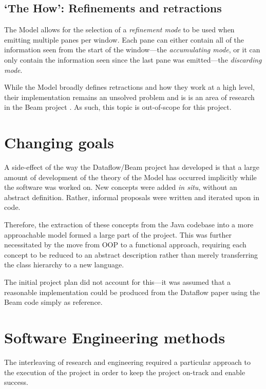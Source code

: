 \subsection{`The How': Refinements and retractions}\label{sec:prep:dataflow:how}

The Model allows for the selection of a \emph{refinement mode} to be used when emitting multiple panes per window.
Each pane can either contain all of the information seen from the start of the window---the \emph{accumulating mode}, or it can only contain the information seen since the last pane was emitted---the \emph{discarding mode}.

While the Model broadly defines retractions and how they work at a high level, their implementation remains an unsolved problem and is is an area of research in the Beam project \cite{JIRA-retractions}.
As such, this topic is out-of-scope for this project.

\section{Changing goals}\label{sec:prep:goals}

A side-effect of the way the Dataflow/Beam project has developed is that a large amount of development of the theory of the Model has occurred implicitly while the software was worked on.
New concepts were added \emph{in situ}, without an abstract definition.
Rather, informal proposals were written and iterated upon in code.

Therefore, the extraction of these concepts from the Java codebase into a more approachable model formed a large part of the project.
This was further necessitated by the move from OOP to a functional approach, requiring each concept to be reduced to an abstract description rather than merely transferring the class hierarchy to a new language.

The initial project plan did not account for this---it was assumed that a reasonable implementation could be produced from the Dataflow paper \cite{Akidau:2015} using the Beam code simply as reference.

\section{Software Engineering methods}\label{sec:prep:softeng}

The interleaving of research and engineering required a particular approach to the execution of the project in order to keep the project on-track and enable success.

